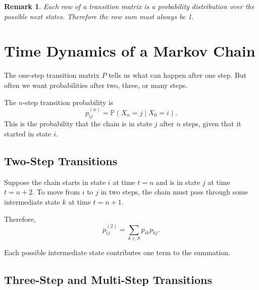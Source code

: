 \documentclass[12pt,a4paper]{article}
\theoremstyle{lecturestyle}
\newtheorem{remark}{Remark}
\newcommand{\Prob}{\mathbb{P}}
\begin{document}
\begin{remark}
Each row of a transition matrix is a probability distribution over the possible next states. Therefore the row sum must always be 1.
\end{remark}

\section{Time Dynamics of a Markov Chain}

The one-step transition matrix $P$ tells us what can happen after one step. But often we want probabilities after two, three, or many steps.

The $n$-step transition probability is
\[
p_{ij}^{(n)}=\Prob(X_n=j\mid X_0=i).
\]
This is the probability that the chain is in state $j$ after $n$ steps, given that it started in state $i$.

\subsection{Two-Step Transitions}

Suppose the chain starts in state $i$ at time $t=n$ and is in state $j$ at time $t=n+2$. To move from $i$ to $j$ in two steps, the chain must pass through some intermediate state $k$ at time $t=n+1$.

Therefore,
\[
p_{ij}^{(2)}=\sum_{k\in S}p_{ik}p_{kj}.
\]

\begin{center}
\end{center}

Each possible intermediate state contributes one term to the summation.

\subsection{Three-Step and Multi-Step Transitions}
\end{document}

